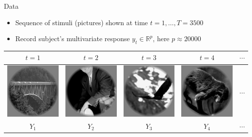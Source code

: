 \documentclass[final]{beamer}
\newlength{\onecolwid}
\begin{document}
\begin{frame}[t]
\begin{columns}[t]
\begin{column}{\onecolwid}
\begin{block}{Data}
\begin{itemize}
\item Sequence of stimuli (pictures) shown at time $t = 1,\hdots, T = 3500$
\item Record subject's multivariate response $y_t \in \mathbb{R}^p$, here $p \approx 20000$
\end{itemize}

\begin{center}
\begin{tabular}{ccccc}
$t = 1$ & $t = 2$ & $t = 3$ & $t = 4$ & $\cdots$\\ \hline
\includegraphics[scale = 0.5]{img1.png} &
\includegraphics[scale = 0.5]{img2.png} &
\includegraphics[scale = 0.5]{img3.png} &
\includegraphics[scale = 0.5]{img4.png} & $\cdots$\\ \hline
$Y_1$ & $Y_2$ & $Y_3$ & $Y_4$ & $\cdots$\\ \hline

\end{tabular}
\end{center}
\end{block}
\end{column}
\end{columns}
\end{frame}
\end{document}
